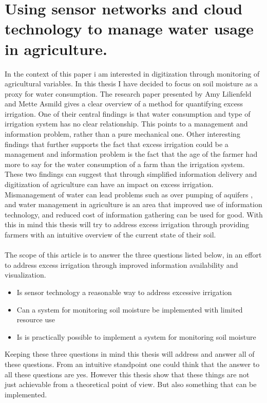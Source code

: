 \documentclass[]{uiophd}
\begin{document}
\section{Using sensor networks and cloud technology to manage water usage in agriculture.}

In the context of this paper i am interested in digitization through monitoring of agricultural variables. In this thesis I have decided to focus on soil moisture as a proxy for water consumption. The research paper presented by Amy Lilienfeld and Mette Asmild gives a clear overview of a method for quantifying excess irrigation. One of their central findings is that water consumption and type of irrigation system has no clear relationship. This points to a management and information problem, rather than a pure mechanical one. Other interesting findings that further supports the fact that excess irrigation could be a management and information problem is the fact that the age of the farmer had more to say for the water consumption of a farm than the irrigation system. These two findings can suggest that through simplified information delivery and digitization of agriculture can have an impact on excess irrigation. Mismanagement of water can lead problems such as over pumping of aquifers \cite{LILIENFELD200773}, and water management in agriculture is an area that improved use of information technology, and reduced cost of information gathering can be used for good. With this in mind this thesis will try to address excess irrigation through providing farmers with an intuitive overview of the current state of their soil. 
\\\\
The scope of this article is to answer the three questions listed below, in an effort to address excess irrigation through improved information availability and visualization.


\begin{itemize}
  \item Is sensor technology a reasonable way to address excessive irrigation
  \item Can a system for monitoring soil moisture be implemented with limited resource use
  \item Is is practically possible to implement a system for monitoring soil moisture 
\end{itemize}
Keeping these three questions in mind this thesis will address and answer all of these questions. From an intuitive standpoint one could think that the answer to all these questions are yes. However this thesis show that these things are not just achievable from a theoretical point of view. But also something that can be implemented.
\end{document}
